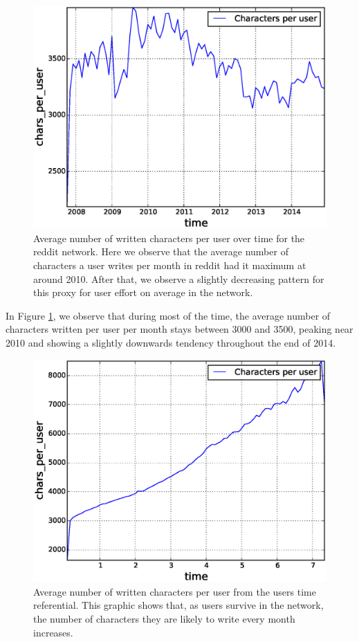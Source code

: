 \begin{figure}[!tb]
\centering
\includegraphics[scale=0.4]{./images/avr_comment_size_user_over_time_total.eps}
\caption{Average number of written characters per user over time for the reddit network. Here we observe that the average number of characters a user writes per month in reddit had it maximum at around 2010. After that, we observe a slightly decreasing pattern for this proxy for user effort on average in the network.}
\label{fig:avr_comment_size_user_over_time_total}
\end{figure}

In Figure \ref{fig:avr_comment_size_user_over_time_total}, we observe that during most of the time, the average number of characters written per user per month stays between 3000 and 3500, peaking near 2010 and showing a slightly downwards tendency throughout the end of 2014.

\begin{figure}[!tb]
\centering
\includegraphics[scale=0.4]{./images/avr_comment_size_user_user_ref_total.eps}
\caption{Average number of written characters per user from the users time referential. This graphic shows that, as users survive in the network, the number of characters they are likely to write every month increases.}
\label{fig:avr_comment_size_user_user_ref_total}
\end{figure}

